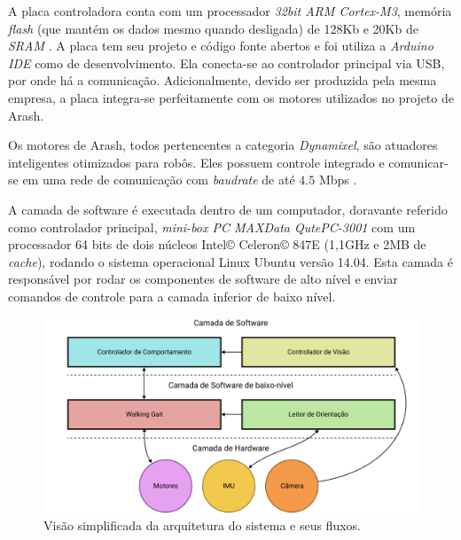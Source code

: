 A placa controladora conta com um processador \textit{32bit ARM Cortex-M3}, memória \textit{flash} (que mantém os dados mesmo quando desligada) de 128Kb e 20Kb de \textit{SRAM} \cite{opencm904}. A placa tem seu projeto e código fonte abertos e foi utiliza a \textit{Arduino IDE} como  de desenvolvimento. Ela conecta-se ao controlador principal via USB, por onde há a comunicação. Adicionalmente, devido ser produzida pela mesma empresa, a placa integra-se perfeitamente com os motores utilizados no projeto de Arash.

Os motores de Arash, todos pertencentes a categoria \textit{Dynamixel}, são atuadores inteligentes otimizados para robôs. Eles possuem controle  integrado e comunicar-se em uma rede de comunicação  com \textit{baudrate} de até $4.5$ Mbps \cite{dynamixel}.

A camada de software é executada dentro de um computador, doravante referido como controlador principal, \textit{mini-box PC MAXData QutePC-3001} com um processador 64 bits de dois núcleos Intel\copyright{} Celeron\copyright{} 847E (1,1GHz e 2MB de \textit{cache}), rodando o sistema operacional Linux Ubuntu versão 14.04. Esta camada é responsável por rodar os componentes de software de alto nível e enviar comandos de controle para a camada inferior de baixo nível.

\begin{figure}[htb]
	\centering
	\includegraphics[scale=1]{imagens/svg/softwarearchitecture-flow}
	\caption{Visão simplificada da arquitetura do sistema e seus fluxos.}
	\label{fig:softwarearchitecture:overview}
\end{figure}

